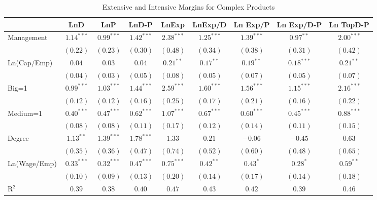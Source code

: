 \documentclass{article}
\begin{document}
\begin{table}
\caption{Extensive and Intensive Margins for Complex Products}
\begin{center}
\begin{normalsize}
\begin{tabular}{l c c c c c c c c}
\hline
 & LnD & LnP & LnD-P & LnExp & LnExp/D & Ln Exp/P & Ln Exp/D-P & Ln TopD-P \\
\hline
Management   & $1.14^{***}$ & $0.99^{***}$ & $1.42^{***}$ & $2.38^{***}$ & $1.25^{***}$ & $1.39^{***}$ & $0.97^{**}$  & $2.00^{***}$ \\
             & $(0.22)$     & $(0.23)$     & $(0.30)$     & $(0.48)$     & $(0.34)$     & $(0.38)$     & $(0.31)$     & $(0.42)$     \\
Ln(Cap/Emp)  & $0.04$       & $0.03$       & $0.04$       & $0.21^{**}$  & $0.17^{**}$  & $0.19^{**}$  & $0.18^{***}$ & $0.21^{**}$  \\
             & $(0.04)$     & $(0.03)$     & $(0.05)$     & $(0.08)$     & $(0.05)$     & $(0.07)$     & $(0.05)$     & $(0.07)$     \\
Big=1        & $0.99^{***}$ & $1.03^{***}$ & $1.44^{***}$ & $2.59^{***}$ & $1.60^{***}$ & $1.56^{***}$ & $1.15^{***}$ & $2.16^{***}$ \\
             & $(0.12)$     & $(0.12)$     & $(0.16)$     & $(0.25)$     & $(0.17)$     & $(0.21)$     & $(0.16)$     & $(0.22)$     \\
Medium=1     & $0.40^{***}$ & $0.47^{***}$ & $0.62^{***}$ & $1.07^{***}$ & $0.67^{***}$ & $0.60^{***}$ & $0.45^{***}$ & $0.88^{***}$ \\
             & $(0.08)$     & $(0.08)$     & $(0.11)$     & $(0.17)$     & $(0.12)$     & $(0.14)$     & $(0.11)$     & $(0.15)$     \\
Degree       & $1.13^{**}$  & $1.39^{***}$ & $1.78^{***}$ & $1.33$       & $0.21$       & $-0.06$      & $-0.45$      & $0.63$       \\
             & $(0.35)$     & $(0.36)$     & $(0.47)$     & $(0.74)$     & $(0.52)$     & $(0.60)$     & $(0.48)$     & $(0.65)$     \\
Ln(Wage/Emp) & $0.33^{***}$ & $0.32^{***}$ & $0.47^{***}$ & $0.75^{***}$ & $0.42^{**}$  & $0.43^{*}$   & $0.28^{*}$   & $0.59^{**}$  \\
             & $(0.10)$     & $(0.09)$     & $(0.13)$     & $(0.20)$     & $(0.14)$     & $(0.17)$     & $(0.14)$     & $(0.18)$     \\
\hline
R$^2$        & $0.39$       & $0.38$       & $0.40$       & $0.47$       & $0.43$       & $0.42$       & $0.39$       & $0.46$       \\

\end{tabular}
\end{normalsize}
\end{center}
\end{table}
\end{document}
